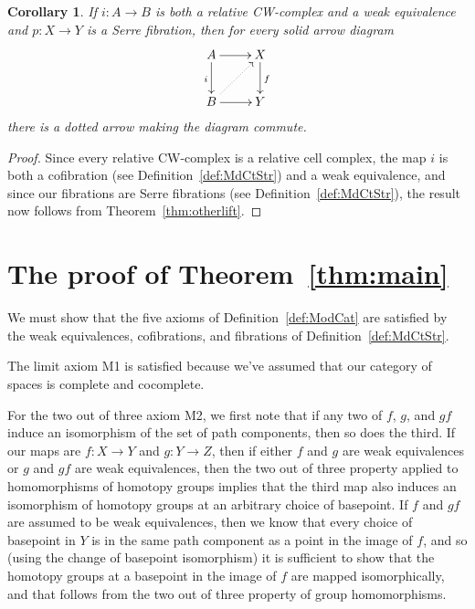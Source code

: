 \documentclass[12pt]{amsart}
\numberwithin{equation}{section}
\theoremstyle{slplain}
\newtheorem{cor}[equation]{Corollary}
\theoremstyle{definition}
\theoremstyle{remark}
\newcommand{\thmref}{Theorem~\ref}
\newcommand{\defref}{Definition~\ref}
\begin{document}
\begin{cor}
  \label{cor:RelCWlift}
  If $i\colon A \to B$ is both a relative CW-complex and a weak
  equivalence and $p\colon X \to Y$ is a Serre fibration, then for
  every solid arrow diagram
  \begin{displaymath}
    \xymatrix{
      {A} \ar[r] \ar[d]_{i}
      & {X} \ar[d]^{f}\\
      {B} \ar[r] \ar@{..>}[ur]
      & {Y}
    }
  \end{displaymath}
  there is a dotted arrow making the diagram commute.
\end{cor}

\begin{proof}
  Since every relative CW-complex is a relative cell complex, the map
  $i$ is both a cofibration (see \defref{def:MdCtStr}) and a weak
  equivalence, and since our fibrations are Serre fibrations (see
  \defref{def:MdCtStr}), the result now follows from
  \thmref{thm:otherlift}.
\end{proof}

\section{The proof of \thmref{thm:main}}
\label{sec:proofmain}

We must show that the five axioms of \defref{def:ModCat} are satisfied
by the weak equivalences, cofibrations, and fibrations of
\defref{def:MdCtStr}.

The limit axiom M1 is satisfied because we've assumed that our
category of spaces is complete and cocomplete.

For the two out of three axiom M2, we first note that if any two of
$f$, $g$, and $gf$ induce an isomorphism of the set of path
components, then so does the third.  If our maps are $f\colon X \to Y$
and $g\colon Y \to Z$, then if either $f$ and $g$ are weak
equivalences or $g$ and $gf$ are weak equivalences, then the two out
of three property applied to homomorphisms of homotopy groups implies
that the third map also induces an isomorphism of homotopy groups at
an arbitrary choice of basepoint.  If $f$ and $gf$ are assumed to be
weak equivalences, then we know that every choice of basepoint in $Y$
is in the same path component as a point in the image of $f$, and so
(using the change of basepoint isomorphism) it is sufficient to show
that the homotopy groups at a basepoint in the image of $f$ are mapped
isomorphically, and that follows from the two out of three property of
group homomorphisms.
\end{document}
